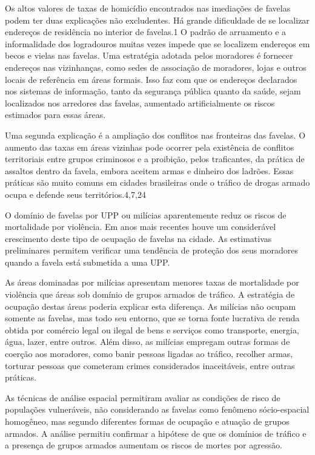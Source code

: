 \documentclass{article}
\begin{document}
Os altos valores de taxas de homicídio encontrados nas imediações de favelas
podem ter duas explicações não excludentes. Há grande dificuldade de se
localizar endereços de residência no interior de favelas.1 O padrão de
arruamento e a informalidade dos logradouros muitas vezes impede que se
localizem endereços em becos e vielas nas favelas. Uma estratégia adotada pelos
moradores é fornecer endereços nas vizinhanças, como sedes de associação de
moradores, lojas e outros locais de referência em áreas formais. Isso faz com
que os endereços declarados nos sistemas de informação, tanto da segurança
pública quanto da saúde, sejam localizados nos arredores das favelas, aumentado
artificialmente os riscos estimados para essas áreas.

Uma segunda explicação é a ampliação dos conflitos nas fronteiras das favelas. O
aumento das taxas em áreas vizinhas pode ocorrer pela existência de conflitos
territoriais entre grupos criminosos e a proibição, pelos traficantes, da
prática de assaltos dentro da favela, embora aceitem armas e dinheiro dos
ladrões. Essas práticas são muito comuns em cidades brasileiras onde o tráfico
de drogas armado ocupa e defende seus territórios.4,7,24

O domínio de favelas por UPP ou milícias aparentemente reduz os riscos de
mortalidade por violência. Em anos mais recentes houve um considerável
crescimento deste tipo de ocupação de favelas na cidade. As estimativas
preliminares permitem verificar uma tendência de proteção dos seus moradores
quando a favela está submetida a uma UPP.

As áreas dominadas por milícias apresentam menores taxas de mortalidade por
violência que áreas sob domínio de grupos armados de tráfico. A estratégia de
ocupação destas áreas poderia explicar esta diferença. As milícias não ocupam
somente as favelas, mas todo seu entorno, que se torna fonte lucrativa de renda
obtida por comércio legal ou ilegal de bens e serviços como transporte, energia,
água, lazer, entre outros. Além disso, as milícias empregam outras formas de
coerção aos moradores, como banir pessoas ligadas ao tráfico, recolher armas,
torturar pessoas que cometeram crimes considerados inaceitáveis, entre outras
práticas.

As técnicas de análise espacial permitiram avaliar as condições de risco de
populações vulneráveis, não considerando as favelas como fenômeno sócio-espacial
homogêneo, mas segundo diferentes formas de ocupação e atuação de grupos
armados. A análise permitiu confirmar a hipótese de que os domínios de tráfico e
a presença de grupos armados aumentam os riscos de mortes por agressão.
\end{document}
